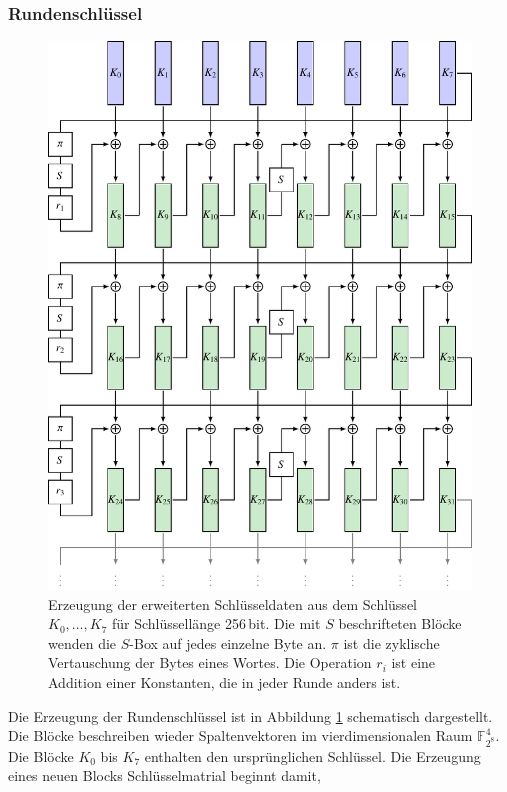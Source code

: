 \subsubsection{Rundenschlüssel}
\begin{figure}
\centering
\includegraphics{chapters/90-crypto/images/keys.pdf}
\caption{Erzeugung der erweiterten Schlüsseldaten aus dem Schlüssel
$K_0,\dots,K_7$ für Schlüssellänge 256\,bit.
Die mit $S$ beschrifteten Blöcke wenden die $S$-Box auf jedes einzelne
Byte an.
$\pi$ ist die zyklische Vertauschung der Bytes eines Wortes.
Die Operation $r_i$ ist eine Addition einer Konstanten, die in jeder
Runde anders ist.
\label{buch:crypto:fig:keys}}
\end{figure}
Die Erzeugung der Rundenschlüssel ist in Abbildung
\ref{buch:crypto:fig:keys}
schematisch dargestellt.
Die Blöcke beschreiben wieder Spaltenvektoren im vierdimensionalen
Raum $\mathbb{F}_{2^8}^4$.
Die Blöcke $K_0$ bis $K_7$ enthalten den ursprünglichen Schlüssel.
Die Erzeugung eines neuen Blocks Schlüsselmatrial beginnt damit,
